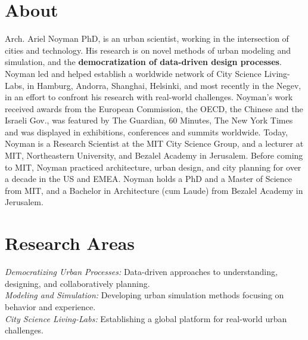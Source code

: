 \section*{About}

 {
  Arch. Ariel Noyman PhD, is an urban scientist, working in the intersection of cities and technology. His research is on novel methods of urban modeling and simulation, and the \textbf{democratization of data-driven design processes}. Noyman led and helped establish a worldwide network of City Science Living-Labs, in Hamburg, Andorra, Shanghai, Helsinki, and most recently in the Negev, in an effort to confront his research with real-world challenges. Noyman's work received awards from the European Commission, the OECD, the Chinese and the Israeli Gov., was featured by The Guardian, 60 Minutes, The New York Times and was displayed in exhibitions, conferences and summits worldwide. Today, Noyman is a Research Scientist at the MIT City Science Group, and a lecturer at MIT, Northeastern University, and Bezalel Academy in Jerusalem. Before coming to MIT, Noyman practiced architecture, urban design, and city planning for over a decade in the US and EMEA. Noyman holds a PhD and a Master of Science from MIT, and a Bachelor in Architecture (cum Laude) from Bezalel Academy in Jerusalem.
 }

\section*{Research Areas}
\textit{Democratizing Urban Processes:} Data-driven approaches to understanding, designing, and collaboratively planning.
\\
\textit{Modeling and Simulation:} Developing urban simulation methods focusing on behavior and experience.
\\
\textit{City Science Living-Labs:} Establishing a global platform for  real-world urban challenges.